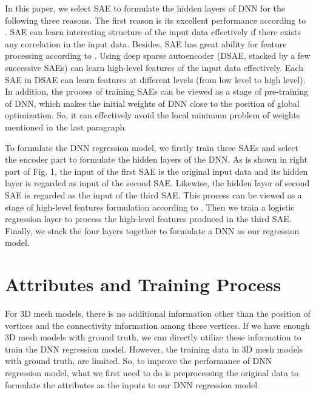 \documentclass[runningheads]{article}
\begin{document}
In this paper, we select SAE to formulate the hidden layers of DNN for the following three reasons. The first reason is its excellent performance according to \cite{sae2011sparse,SAE2009_3790}. SAE can learn interesting structure of the input data effectively if there exists any correlation in the input data. Besides, SAE has great ability for feature processing according to \cite{icasspsae}. Using deep sparse autoencoder (DSAE, stacked by a few successive SAEs) can learn high-level features of the input data effectively. Each SAE in DSAE can learn features at different levels (from low level to high level). In addition, the process of training SAEs can be viewed as a stage of pre-training of DNN, which makes the initial weights of DNN close to the position of global optimization. So, it can effectively avoid the local minimum problem of weights mentioned in the last paragraph.

To formulate the DNN regression model, we firstly train three SAEs and select the encoder part to formulate the hidden layers of the DNN. As is shown in right part of Fig. 1, the input of the first SAE is the original input data and its hidden layer is regarded as input of the second SAE. Likewise, the hidden layer of second SAE is regarded as the input of the third SAE. This process can be viewed as a stage of high-level features formulation according to \cite{icasspsae}. Then we train a logistic regression layer to process the high-level features produced in the third SAE. Finally, we stack the four layers together to formulate a DNN as our regression model.

\section{Attributes and Training Process}
For 3D mesh models, there is no additional information other than the position of vertices and the connectivity information among these vertices. If we have enough 3D mesh models with ground truth, we can directly utilize these information to train the DNN regression model. However, the training data in 3D mesh models with ground truth, are limited. So, to improve the performance of DNN regression model, what we first need to do is preprocessing the original data to formulate the attributes as the inputs to our DNN regression model.
\end{document}
